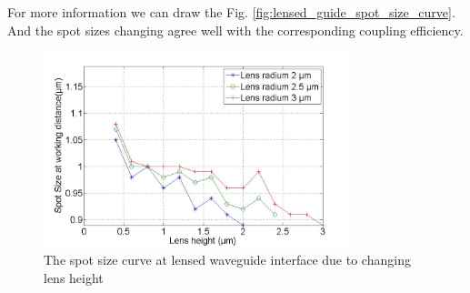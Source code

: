 For more information we can draw the Fig. \ref{fig:lensed_guide_spot_size_curve}. And the spot sizes changing agree well with the corresponding coupling efficiency.
\begin{figure}[!ht]
\centering
\includegraphics[width=0.8\textwidth]{bilder/spot_fix_lens_radium_hxx}
\caption{The spot size curve at lensed waveguide interface due to changing lens height}
\label{fig:lensed_guide_spot_size_curve }
\end{figure}
